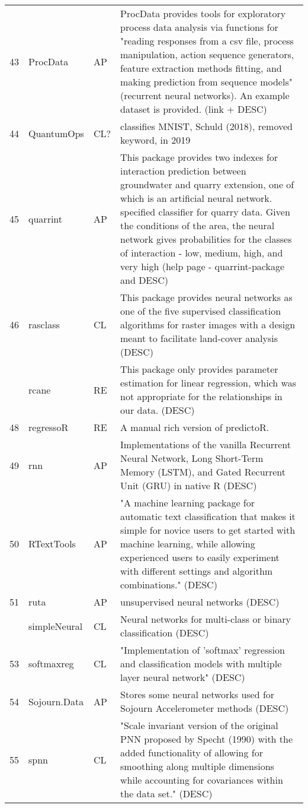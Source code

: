 \begin{Schunk}
\begin{longtable}[t]{lll>{\raggedright\arraybackslash}p{10cm}}
43 & ProcData & AP & ProcData provides tools for exploratory process data analysis via functions for "reading responses from a csv file, process manipulation, action sequence generators, feature extraction methods fitting, and making prediction from sequence models" (recurrent neural networks). An example dataset is provided. (link + DESC)\\
44 & QuantumOps & CL? & classifies MNIST, Schuld (2018), removed keyword, in 2019\\
45 & quarrint & AP & This package provides two indexes for interaction prediction between groundwater and quarry extension, one of which is an artificial neural network. specified classifier for quarry data. Given the conditions of the area, the neural network gives probabilities for the classes of interaction - low, medium, high, and very high (help page - quarrint-package and DESC)\\
46 & rasclass & CL & This package provides neural networks as one of the five supervised classification algorithms for raster images with a design meant to facilitate land-cover analysis (DESC)\\
\addlinespace
47 & rcane & RE & This package only provides parameter estimation for linear regression, which was not appropriate for the relationships in our data. (DESC)\\
48 & regressoR & RE & A manual rich version of predictoR.\\
49 & rnn & AP & Implementations of the vanilla Recurrent Neural Network, Long Short-Term Memory (LSTM), and Gated Recurrent Unit (GRU) in native R (DESC)\\
50 & RTextTools & AP & "A machine learning package for automatic text classification that makes it simple for novice users to get started with machine learning, while allowing experienced users to easily experiment with different settings and algorithm combinations." (DESC)\\
51 & ruta & AP & unsupervised neural networks (DESC)\\
\addlinespace
52 & simpleNeural & CL & Neural networks for multi-class or binary classification (DESC)\\
53 & softmaxreg & CL & "Implementation of 'softmax' regression and classification models with multiple layer neural network" (DESC)\\
54 & Sojourn.Data & AP & Stores some neural networks used for Sojourn Accelerometer methods (DESC)\\
55 & spnn & CL & "Scale invariant version of the original PNN proposed by Specht (1990) with the added functionality of allowing for smoothing along multiple dimensions while accounting for covariances within the data set." (DESC)\\

\end{longtable}
\end{Schunk}
